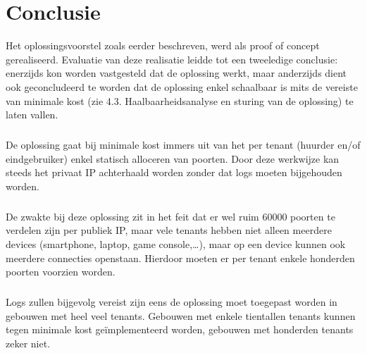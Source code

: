 
\chapter{Conclusie}%
\label{ch:conclusie}
Het oplossingsvoorstel zoals eerder beschreven, werd als proof of concept gerealiseerd. Evaluatie van deze realisatie leidde tot een tweeledige conclusie: enerzijds kon worden vastgesteld dat de oplossing werkt, maar anderzijds dient ook geconcludeerd te worden dat de oplossing enkel schaalbaar is mits de vereiste van minimale kost (zie 4.3. Haalbaarheidsanalyse en sturing van de oplossing) te laten vallen.

\paragraph{}
De oplossing gaat bij minimale kost immers uit van het per tenant (huurder en/of eindgebruiker) enkel statisch alloceren van poorten. Door deze werkwijze kan steeds het privaat IP achterhaald worden zonder dat logs moeten bijgehouden worden.

\paragraph{}
De zwakte bij deze oplossing zit in het feit dat er wel ruim 60000 poorten te verdelen zijn per publiek IP, maar vele tenants hebben niet alleen meerdere devices (smartphone, laptop, game console,…), maar op een device kunnen ook meerdere connecties openstaan. Hierdoor moeten er per tenant enkele honderden poorten voorzien worden.

\paragraph{}
Logs zullen bijgevolg vereist zijn eens de oplossing moet toegepast worden in gebouwen met heel veel tenants. Gebouwen met enkele tientallen tenants kunnen tegen minimale kost geïmplementeerd worden, gebouwen met honderden tenants zeker niet.

